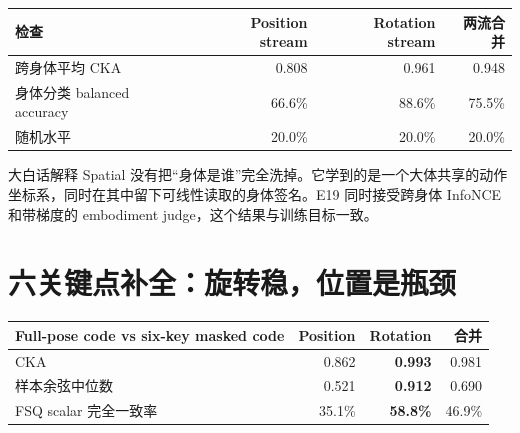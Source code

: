 \documentclass[10pt,a4paper,fontset=none]{ctexart}
\begin{document}
\vspace{5mm}
\begin{tabularx}{\linewidth}{@{}lRRR@{}}
\toprule
检查 & Position stream & Rotation stream & 两流合并 \\
\midrule
跨身体平均 CKA & 0.808 & 0.961 & 0.948 \\
身体分类 balanced accuracy & 66.6\% & 88.6\% & 75.5\% \\
随机水平 & 20.0\% & 20.0\% & 20.0\% \\
\bottomrule
\end{tabularx}

\begin{insightbox}{大白话解释}
Spatial 没有把“身体是谁”完全洗掉。它学到的是一个大体共享的动作坐标系，同时在其中留下可线性读取的身体签名。E19 同时接受跨身体 InfoNCE 和带梯度的 embodiment judge，这个结果与训练目标一致。
\end{insightbox}

\section{六关键点补全：旋转稳，位置是瓶颈}

\begin{tabularx}{\linewidth}{@{}lRRR@{}}
\toprule
Full-pose code vs six-key masked code & Position & Rotation & 合并 \\
\midrule
CKA & 0.862 & \textbf{0.993} & 0.981 \\
样本余弦中位数 & 0.521 & \textbf{0.912} & 0.690 \\
FSQ scalar 完全一致率 & 35.1\% & \textbf{58.8\%} & 46.9\% \\
\bottomrule
\end{tabularx}

\vspace{7mm}
\end{document}
